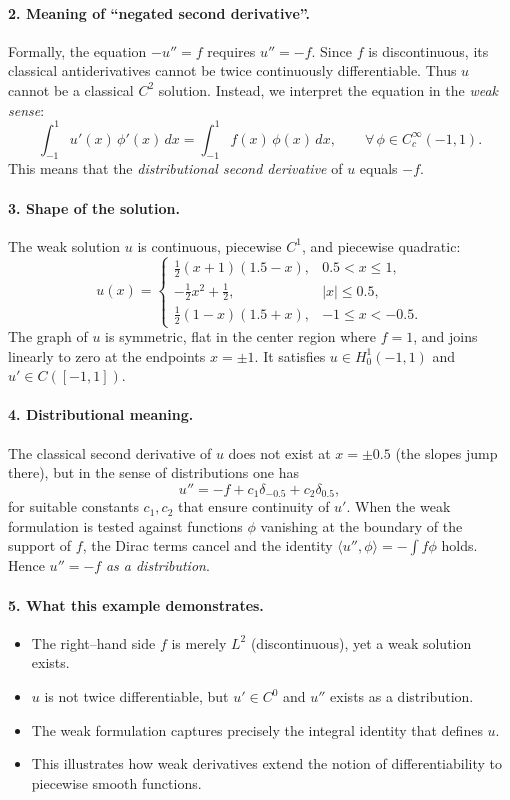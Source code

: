 \documentclass[12pt,a4paper]{article}
\theoremstyle{plain}
\theoremstyle{definition}
\theoremstyle{remark}
\theoremstyle{remark}
\begin{document}
\bigskip

\paragraph{2. Meaning of ``negated second derivative''.}
Formally, the equation $-u''=f$ requires $u''=-f$. 
Since $f$ is discontinuous, its classical antiderivatives cannot be twice continuously differentiable.
Thus $u$ cannot be a classical $C^2$ solution.
Instead, we interpret the equation in the \emph{weak sense}:
\[
\int_{-1}^{1} u'(x)\,\phi'(x)\,dx
=\int_{-1}^{1} f(x)\,\phi(x)\,dx,
\qquad \forall\,\phi\in C_c^\infty(-1,1).
\]
This means that the \emph{distributional second derivative} of $u$ equals $-f$.

\bigskip

\paragraph{3. Shape of the solution.}
The weak solution $u$ is continuous, piecewise $C^1$, and piecewise quadratic:
\[
u(x)=
\begin{cases}
	\frac{1}{2}(x+1)(1.5-x), & 0.5<x\le1,\\[6pt]
	-\tfrac{1}{2}x^2 + \tfrac{1}{2}, & |x|\le0.5,\\[6pt]
	\frac{1}{2}(1-x)(1.5+x), & -1\le x<-0.5.
\end{cases}
\]
The graph of $u$ is symmetric, flat in the center region where $f=1$, and joins linearly to zero at the endpoints $x=\pm1$.
It satisfies $u\in H_0^1(-1,1)$ and $u'\in C([-1,1])$.

\bigskip

\paragraph{4. Distributional meaning.}
The classical second derivative of $u$ does not exist at $x=\pm0.5$ (the slopes jump there),
but in the sense of distributions one has
\[
u'' = -f + c_1\delta_{-0.5} + c_2\delta_{0.5},
\]
for suitable constants $c_1,c_2$ that ensure continuity of $u'$.
When the weak formulation is tested against functions $\phi$ vanishing at the boundary of the support of $f$, 
the Dirac terms cancel and the identity $\langle u'',\phi\rangle=-\!\int f\phi$ holds.
Hence $u''=-f$ \emph{as a distribution}.

\bigskip

\paragraph{5. What this example demonstrates.}
\begin{itemize}
	\item The right--hand side $f$ is merely $L^2$ (discontinuous), yet a weak solution exists.
	\item $u$ is not twice differentiable, but $u'\in C^0$ and $u''$ exists as a distribution.
	\item The weak formulation captures precisely the integral identity that defines $u$.
	\item This illustrates how weak derivatives extend the notion of differentiability to piecewise smooth functions.
\end{itemize}
\end{document}
